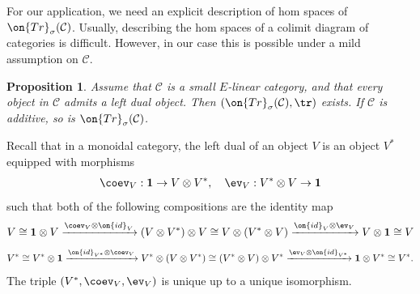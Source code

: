 \documentclass[11pt]{amsart}
\newtheorem{prop}[thm]{Proposition}
\theoremstyle{definition}
\theoremstyle{definition}
\theoremstyle{definition}
\numberwithin{equation}{subsection}
\newcommand{\mC}{{\mathcal C}}
\newcommand{\id}{{\on{id}}}
\newcommand{\Tr}{{\on{Tr}}}
\begin{document}
For our application, we need an explicit description of hom spaces of $\Tr_\sigma(\mC)$. Usually, describing the hom spaces of a colimit diagram of categories is difficult. However, in our case this is possible under a mild assumption on $\mC$.
\begin{prop}
\label{L:trace cat}
Assume that $\mC$ is a small $E$-linear category, and that every object in $\mC$ admits a left dual object. Then $(\Tr_\sigma(\mC),\tr)$ exists. If $\mC$ is additive, so is $\Tr_\sigma(\mC)$.
\end{prop}
Recall that in a monoidal category, the left dual of an object $V$ is an object $V^*$ equipped with morphisms 
$$\coev_V:\mathbf{1}\to V\otimes V^*,\quad \ev_V: V^*\otimes V\to \mathbf{1}$$ 
such that both of the following compositions are the identity map
\[V\cong \mathbf{1}\otimes V\xrightarrow{\coev_V\otimes\id_{V}}(V\otimes V^*)\otimes V\cong V\otimes (V^*\otimes V)\xrightarrow{\id_{V}\otimes\ev_V}V\otimes\mathbf{1}\cong V\]
\[V^*\cong V^*\otimes\mathbf{1}\xrightarrow{\id_{V^*}\otimes\coev_V} V^*\otimes (V\otimes V^*)\cong (V^*\otimes V)\otimes V^*\xrightarrow{\ev_V\otimes\id_{V^*}}\mathbf{1}\otimes V^*\cong V^*.\]
The triple $(V^*,\coev_V,\ev_V)$ is unique up to a unique isomorphism.
\end{document}
